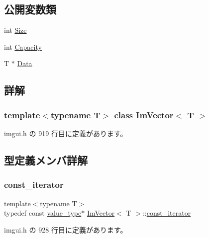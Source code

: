 \subsection*{公開変数類}
\begin{DoxyCompactItemize}
\item 
int \mbox{\hyperlink{class_im_vector_abbfd157947f66280d27b21d70a16df8d}{Size}}
\item 
int \mbox{\hyperlink{class_im_vector_abd24482b4d30d22e37582e521e5bfb33}{Capacity}}
\item 
T $\ast$ \mbox{\hyperlink{class_im_vector_ac0e46e8b30cb079d93c8f0aad7d7cbd0}{Data}}
\end{DoxyCompactItemize}


\subsection{詳解}
\subsubsection*{template$<$typename T$>$\newline
class Im\+Vector$<$ T $>$}



 imgui.\+h の 919 行目に定義があります。



\subsection{型定義メンバ詳解}
\mbox{\label{class_im_vector_aedeac9c5080f9d6ce96ae837768ee4c4}} 
\subsubsection{\texorpdfstring{const\+\_\+iterator}{const\_iterator}}
{\footnotesize\ttfamily template$<$typename T$>$ \\
typedef const \mbox{\hyperlink{class_im_vector_a8bd77e4e7581d8e5f9e98d7c2f3c2a80}{value\+\_\+type}}$\ast$ \mbox{\hyperlink{class_im_vector}{Im\+Vector}}$<$ T $>$\+::\mbox{\hyperlink{class_im_vector_aedeac9c5080f9d6ce96ae837768ee4c4}{const\+\_\+iterator}}}



 imgui.\+h の 928 行目に定義があります。

